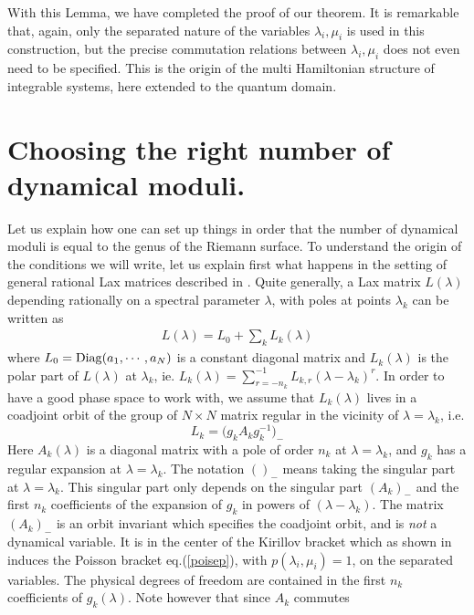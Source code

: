 \documentclass[a4paper,11pt]{article}
\begin{document}
With this Lemma, we have completed the proof of our theorem. 
It is remarkable that, again, only the separated nature of the variables $\lambda_i, \mu_i$
is used in this construction, but the precise commutation relations between 
$\lambda_i, \mu_i$ does not even need to be specified. This is the origin of 
the multi Hamiltonian structure of integrable systems, here extended to the quantum
domain.



\section{Choosing the right number of dynamical moduli.}

Let us explain how one can set up things in order that 
the number of dynamical moduli is equal to the genus of the Riemann surface.
To understand the origin  of the conditions we will write, 
let us explain  first what happens in the setting of general rational Lax matrices
described in \cite{BaTa99,BaBeTa03}.
Quite generally, a Lax matrix $L(\lambda)$ depending 
 rationally on a spectral parameter $\lambda$, with poles at points $\lambda _k$
can be written as
\begin{eqnarray}
L(\lambda) = L_0 + \sum_k L_k(\lambda) 
\label{laxmatrix}
\end{eqnarray}
where $L_0={\rm Diag}(a_1,\cdots,a_N)$ is a constant diagonal matrix and
$L_k(\lambda)$ is
the polar part of $L(\lambda )$ at $\lambda _k$, ie. $L_k(\lambda)=\sum_{r=-n_k}^{-1}
L_{k,r} (\lambda -\lambda _k)^r$.  
In order to have a good phase space to work with, we  assume that $L_k(\lambda)$ 
lives in a coadjoint orbit of the group of $N\times N$ matrix regular in the vicinity of
$\lambda =\lambda _k$, i.e.
$$
L_k = \Big(g_k A_k g_k^{-1}\Big)_-
$$
Here  $A_k(\lambda )$ is a diagonal matrix with a pole of order
$n_k$ at $\lambda =\lambda _k$, and $g_k$ has a regular expansion at $\lambda =\lambda _k$.  The notation $()_-$ means
taking the singular part at $\lambda =\lambda _k$. This singular part only
depends on the singular part $(A_k)_-$ and the first $n_k$
coefficients of the expansion of $g_k$ in powers of $(\lambda -\lambda _k)$.  
The matrix $(A_k)_-$ is an orbit invariant which specifies the coadjoint orbit, and is
 {\em not} a dynamical variable. It is in the center of the Kirillov bracket which 
as shown in \cite{BaTa99} induces the Poisson bracket 
eq.(\ref{poisep}), with $p(\lambda_i,\mu_i)=1$, on the separated variables. 
The physical degrees of freedom are contained in the first $n_k$
coefficients of $g_k(\lambda )$. Note however that since $A_k$ commutes 
\end{document}
